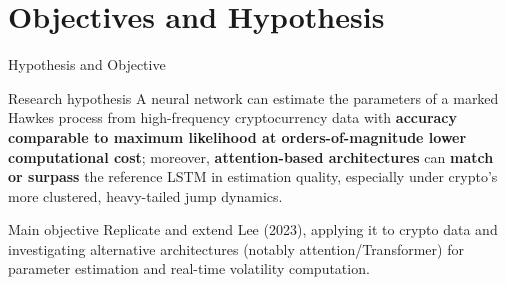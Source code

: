 \documentclass[aspectratio=169]{beamer}
\begin{document}
\section{Objectives and Hypothesis}
\begin{frame}{Hypothesis and Objective}
  \begin{alertblock}{Research hypothesis}
    A neural network can estimate the parameters of a marked Hawkes process from high-frequency cryptocurrency data with \textbf{accuracy comparable to maximum likelihood at orders-of-magnitude lower computational cost}; moreover, \textbf{attention-based architectures} can \textbf{match or surpass} the reference LSTM in estimation quality, especially under crypto's more clustered, heavy-tailed jump dynamics.
  \end{alertblock}
  \begin{block}{Main objective}
    Replicate and extend Lee (2023), applying it to crypto data and investigating alternative architectures (notably attention/Transformer) for parameter estimation and real-time volatility computation.
  \end{block}
\end{frame}
\end{document}
